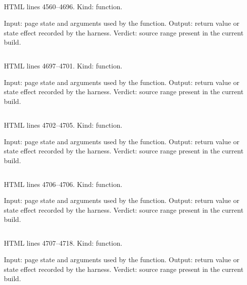 \subsection*{\texttt{}}
\label{vf_189_sopEvaluateRun}
HTML lines 4560--4696. Kind: function.

Input: page state and arguments used by the function.
Output: return value or state effect recorded by the harness.
Verdict: source range present in the current build.

\subsection*{\texttt{}}
\label{vf_190_sopEvaluateAll}
HTML lines 4697--4701. Kind: function.

Input: page state and arguments used by the function.
Output: return value or state effect recorded by the harness.
Verdict: source range present in the current build.

\subsection*{\texttt{}}
\label{vf_191_sopResultForWell}
HTML lines 4702--4705. Kind: function.

Input: page state and arguments used by the function.
Output: return value or state effect recorded by the harness.
Verdict: source range present in the current build.

\subsection*{\texttt{}}
\label{vf_192_sopMeta}
HTML lines 4706--4706. Kind: function.

Input: page state and arguments used by the function.
Output: return value or state effect recorded by the harness.
Verdict: source range present in the current build.

\subsection*{\texttt{}}
\label{vf_193_sopInterpretationRows}
HTML lines 4707--4718. Kind: function.

Input: page state and arguments used by the function.
Output: return value or state effect recorded by the harness.
Verdict: source range present in the current build.


